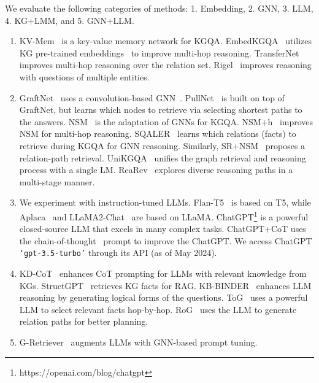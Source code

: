 We evaluate the following categories of methods: 1. Embedding, 2. GNN, 3. LLM, 4. KG+LMM, and 5. GNN+LLM.
\begin{enumerate}
    \item KV-Mem~\cite{miller2016key} is a key-value memory network  for KGQA. EmbedKGQA~\cite{saxena2020improving} utilizes KG pre-trained embeddings~\cite{trouillon2016complex} to improve multi-hop reasoning. TransferNet~\cite{shi2021transfernet} improves multi-hop reasoning over the relation set. Rigel~\cite{sen2021expanding} improves reasoning with questions of multiple entities.
    \item GraftNet~\cite{sun-etal-2018-open} uses a convolution-based GNN~\cite{kipf2016semi}. PullNet~\cite{sun2019pullnet} is built on top of GraftNet, but learns which nodes to retrieve via selecting shortest paths to the answers. NSM~\cite{he2021improving} is the adaptation of GNNs  for KGQA. NSM+h~\cite{he2021improving} improves NSM for multi-hop reasoning. SQALER~\cite{atzeni2021sqaler} learns which relations (facts) to retrieve during KGQA for GNN reasoning. Similarly, SR+NSM~\citep{zhang2022subgraph} proposes a relation-path retrieval. UniKGQA~\citep{jiang2023unikgqa} unifies the graph retrieval and reasoning process with a single LM. ReaRev~\citep{mavromatis2022rearev} explores diverse reasoning paths in a multi-stage manner.
    \item We experiment with instruction-tuned LLMs. Flan-T5~\citep{chung2024scaling} is based on T5, while Aplaca~\citep{alpaca2023} and LLaMA2-Chat~\citep{touvron2023llama} are based on LLaMA. ChatGPT\footnote{https://openai.com/blog/chatgpt} is a powerful closed-source LLM that excels in many complex tasks. ChatGPT+CoT uses the chain-of-thought~\citep{wei2022chain} prompt to improve the ChatGPT. We access ChatGPT \texttt{`gpt-3.5-turbo'} through its API (as of May 2024).
    \item KD-CoT~\citep{wang2023knowledge} enhances CoT prompting for LLMs with relevant knowledge from KGs. StructGPT~\citep{jiang2023structgpt} retrieves KG facts for RAG. KB-BINDER~\citep{li2023binder} enhances LLM reasoning by generating logical forms of the questions. ToG~\citep{sun2024tog} uses a powerful LLM to select  relevant facts hop-by-hop. RoG~\citep{luo2024rog} uses the LLM to generate relation paths for better planning.
    \item G-Retriever~\citep{he2024gretriever} augments LLMs with GNN-based prompt tuning.
\end{enumerate}


